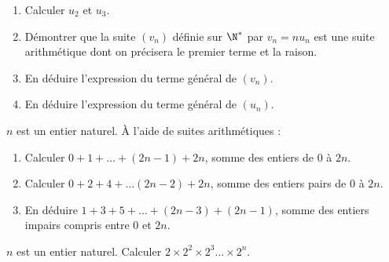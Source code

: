 \documentclass[a4paper,11pt,exos]{nsi} %
\begin{document}
\begin{enumerate}
	\item 	Calculer $u_2$ et $u_3$.
	\item 	Démontrer que la suite $(v_n)$ définie sur $\N^*$ par $v_n=nu_n$ est une suite arithmétique dont on précisera le premier terme et la raison.
	\item 	En déduire l'expression du terme général de $(v_n)$.
	\item 	En déduire l'expression du terme général de $(u_n)$.
\end{enumerate}



\exo{}
$n$ est un entier naturel. À l'aide de suites arithmétiques :
\begin{enumerate}
	\item 	Calculer  $0+1+\dots+(2n-1)+2n$, somme des entiers de 0 à $2n$.
	\item 	Calculer  $0+2+4+\ldots (2n-2)+2n$, somme des entiers pairs de 0 à $2n$.
	\item 	En déduire $1+3+5+\ldots+(2n-3)+(2n-1)$, somme des entiers impairs compris entre 0 et $2n$.
\end{enumerate}

\exo{}
$n$ est un entier naturel. Calculer $2\times 2^2\times 2^3\ldots\times 2^n$.
\end{document}
